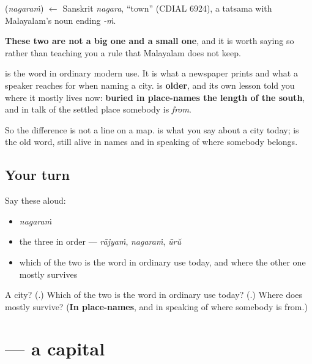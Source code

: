 \begin{cousinweb}
\textbf{} (\emph{nagaraṁ}) $\leftarrow$ Sanskrit \emph{nagara}, \textquotedblleft{}town\textquotedblright{} (CDIAL 6924), a tatsama with Malayalam's noun ending \emph{-ṁ}.
\end{cousinweb}

\begin{culture}
\textbf{These two are not a big one and a small one}, and it is worth saying so rather than teaching you a rule that Malayalam does not keep.

\textbf{} is the word in ordinary modern use. It is what a newspaper prints and what a speaker reaches for when naming a city. \textbf{} is \textbf{older}, and its own lesson told you where it mostly lives now: \textbf{buried in place-names the length of the south}, and in talk of the settled place somebody is \emph{from}.

So the difference is not a line on a map. \textbf{} is what you say about a city today; \textbf{} is the old word, still alive in names and in speaking of where somebody belongs.
\end{culture}

\subsection*{Your turn}
Say these aloud:

\begin{itemize}
\raggedright
  \item \emph{nagaraṁ}
  \item the three in order — \emph{rājyaṁ}, \emph{nagaraṁ}, \emph{ūrŭ}
  \item which of the two is the word in ordinary use today, and where the other one mostly survives
\end{itemize}

\begin{tcolorbox}[breakable,colback=teal!4,colframe=teal!35!black,title={Before you move on}]
A city? (\textbf{}.) Which of the two is the word in ordinary use today? (\textbf{}.) Where does \textbf{} mostly survive? (\textbf{In place-names}, and in speaking of where somebody is from.)
\end{tcolorbox}
\section[\texorpdfstring{\ml{തലസ്ഥാനം} (talasthānaṁ)}{തലസ്ഥാനം (talasthānaṁ)}]{ — a capital}

